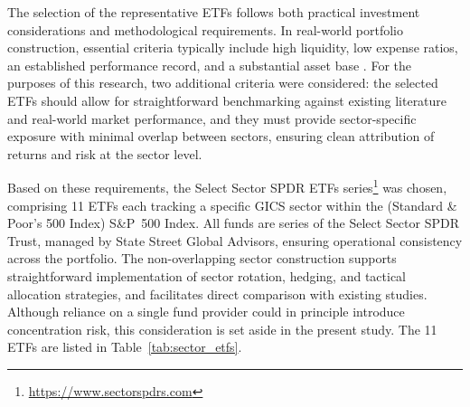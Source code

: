 The selection of the representative ETFs follows both practical investment considerations and methodological requirements. In real-world portfolio construction, essential criteria typically include high liquidity, low expense ratios, an established performance record, and a substantial asset base \cite{hill2015etf}. For the purposes of this research, two additional criteria were considered: the selected ETFs should allow for straightforward benchmarking against existing literature and real-world market performance, and they must provide sector-specific exposure with minimal overlap between sectors, ensuring clean attribution of returns and risk at the sector level.

Based on these requirements, the Select Sector SPDR ETFs series\footnote{\url{https://www.sectorspdrs.com}} was chosen, comprising 11 ETFs each tracking a specific GICS sector within the (Standard \& Poor's 500 Index) S\&P~500 Index. All funds are series of the Select Sector SPDR Trust, managed by State Street Global Advisors, ensuring operational consistency across the portfolio. The non-overlapping sector construction supports straightforward implementation of sector rotation, hedging, and tactical allocation strategies, and facilitates direct comparison with existing studies. Although reliance on a single fund provider could in principle introduce concentration risk, this consideration is set aside in the present study. The 11 ETFs are listed in Table~\ref{tab:sector_etfs}.

